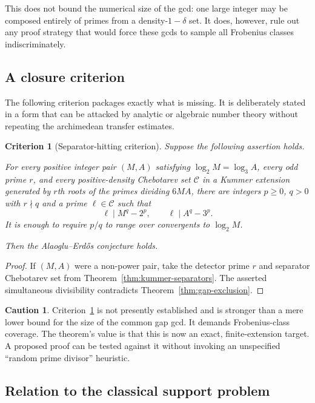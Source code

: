 \documentclass[11pt,oneside]{article}
\newtheorem{criterion}[theorem]{Criterion}
\theoremstyle{definition}
\newtheorem{warning}[theorem]{Caution}
\theoremstyle{remark}
\newcommand{\AEname}{Alaoglu--Erd\H{o}s}
\begin{document}
This does not bound the numerical size of the gcd: one large integer may be composed entirely
of primes from a density-$1-\delta$ set.  It does, however, rule out any proof strategy that
would force these gcds to sample all Frobenius classes indiscriminately.

\subsection{A closure criterion}

The following criterion packages exactly what is missing.  It is deliberately stated in a
form that can be attacked by analytic or algebraic number theory without repeating the
archimedean transfer estimates.

\begin{criterion}[Separator-hitting criterion]
\label{crit:separator-hitting}
Suppose the following assertion holds.

For every positive integer pair $(M,A)$ satisfying
$\log_2 M=\log_3 A$, every odd prime $r$, and every positive-density Chebotarev set
$\mathcal C$ in a Kummer extension generated by $r$th roots of the primes dividing $6MA$,
there are integers $p\ge0$, $q>0$ with $r\nmid q$ and a prime $\ell\in\mathcal C$ such that
\[
 \ell\mid M^q-2^p,
 \qquad
 \ell\mid A^q-3^p.
\]
It is enough to require $p/q$ to range over convergents to $\log_2 M$.

Then the \AEname{} conjecture holds.
\end{criterion}

\begin{proof}
If $(M,A)$ were a non-power pair, take the detector prime $r$ and separator Chebotarev set
from Theorem~\ref{thm:kummer-separators}.  The asserted simultaneous divisibility contradicts
Theorem~\ref{thm:gap-exclusion}.
\end{proof}

\begin{warning}
Criterion~\ref{crit:separator-hitting} is not presently established and is stronger than a
mere lower bound for the size of the common gap gcd.  It demands Frobenius-class coverage.
The theorem's value is that this is now an exact, finite-extension target.  A proposed proof
can be tested against it without invoking an unspecified ``random prime divisor'' heuristic.
\end{warning}

\subsection{Relation to the classical support problem}
\end{document}
